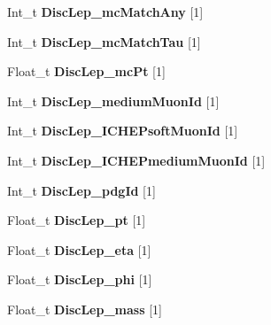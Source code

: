 \begin{DoxyCompactItemize}
\hypertarget{classMiniTree_ad24164c8d49f7c3efb3421d8be7341a0}{}\label{classMiniTree_ad24164c8d49f7c3efb3421d8be7341a0} 
Int\+\_\+t {\bfseries Disc\+Lep\+\_\+mc\+Match\+Any} \mbox{[}1\mbox{]}
\item 
\hypertarget{classMiniTree_a96e476717fae434dac3b70bcf1fadddf}{}\label{classMiniTree_a96e476717fae434dac3b70bcf1fadddf} 
Int\+\_\+t {\bfseries Disc\+Lep\+\_\+mc\+Match\+Tau} \mbox{[}1\mbox{]}
\item 
\hypertarget{classMiniTree_a6a97bf86e32a42214b457b56c38f2b16}{}\label{classMiniTree_a6a97bf86e32a42214b457b56c38f2b16} 
Float\+\_\+t {\bfseries Disc\+Lep\+\_\+mc\+Pt} \mbox{[}1\mbox{]}
\item 
\hypertarget{classMiniTree_aac93817075ff8fef360624394b201f1c}{}\label{classMiniTree_aac93817075ff8fef360624394b201f1c} 
Int\+\_\+t {\bfseries Disc\+Lep\+\_\+medium\+Muon\+Id} \mbox{[}1\mbox{]}
\item 
\hypertarget{classMiniTree_aeaf0608a330ebfc11b0725dc3bfeaa5d}{}\label{classMiniTree_aeaf0608a330ebfc11b0725dc3bfeaa5d} 
Int\+\_\+t {\bfseries Disc\+Lep\+\_\+\+I\+C\+H\+E\+Psoft\+Muon\+Id} \mbox{[}1\mbox{]}
\item 
\hypertarget{classMiniTree_a9d8ffa227ac6f5efed40a3ffb996d08a}{}\label{classMiniTree_a9d8ffa227ac6f5efed40a3ffb996d08a} 
Int\+\_\+t {\bfseries Disc\+Lep\+\_\+\+I\+C\+H\+E\+Pmedium\+Muon\+Id} \mbox{[}1\mbox{]}
\item 
\hypertarget{classMiniTree_ad4fcc42d3888ebdd7c911064265dfdac}{}\label{classMiniTree_ad4fcc42d3888ebdd7c911064265dfdac} 
Int\+\_\+t {\bfseries Disc\+Lep\+\_\+pdg\+Id} \mbox{[}1\mbox{]}
\item 
\hypertarget{classMiniTree_ab2d1e0bb42b8ce1b972fdb8d01954c8b}{}\label{classMiniTree_ab2d1e0bb42b8ce1b972fdb8d01954c8b} 
Float\+\_\+t {\bfseries Disc\+Lep\+\_\+pt} \mbox{[}1\mbox{]}
\item 
\hypertarget{classMiniTree_aa6c362598d4bf691ac0859420318496d}{}\label{classMiniTree_aa6c362598d4bf691ac0859420318496d} 
Float\+\_\+t {\bfseries Disc\+Lep\+\_\+eta} \mbox{[}1\mbox{]}
\item 
\hypertarget{classMiniTree_a34add74677f2374cf9a7473b9789ec19}{}\label{classMiniTree_a34add74677f2374cf9a7473b9789ec19} 
Float\+\_\+t {\bfseries Disc\+Lep\+\_\+phi} \mbox{[}1\mbox{]}
\item 
\hypertarget{classMiniTree_ac051f7c610de75052b8c3610152e1596}{}\label{classMiniTree_ac051f7c610de75052b8c3610152e1596} 
Float\+\_\+t {\bfseries Disc\+Lep\+\_\+mass} \mbox{[}1\mbox{]}
\item 

\end{DoxyCompactItemize}
